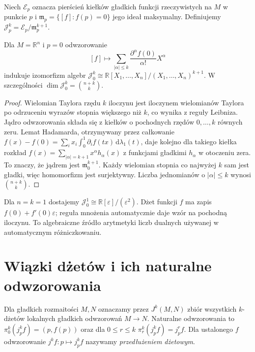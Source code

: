 \begin{definicja}
\label{def:dzety-algebra}
Niech $\mathcal E_p$ oznacza pierścień kiełków gładkich
funkcji rzeczywistych na $M$ w punkcie $p$ i
$\mathfrak m_p=\{[f]:f(p)=0\}$ jego ideał maksymalny.
Definiujemy $\mathcal J_p^k=\mathcal E_p/\mathfrak m_p^{k+1}$.
\end{definicja}

\begin{twierdzenie}
\label{thm:dzety-algebra}
Dla $M=\mathbb R^n$ i $p=0$ odwzorowanie
\[
 [f]\longmapsto \sum_{|\alpha|\le k}
 \frac{\partial^\alpha f(0)}{\alpha!}X^\alpha
\]
indukuje izomorfizm algebr
$\mathcal J_0^k\cong\mathbb R[X_1,\ldots,X_n]/(X_1,\ldots,X_n)^{k+1}$.
W szczególności $\dim\mathcal J_0^k=\binom{n+k}{k}$.
\end{twierdzenie}
\begin{proof}
Wielomian Taylora rzędu $k$ iloczynu jest iloczynem
wielomianów Taylora po odrzuceniu wyrazów stopnia większego niż $k$,
co wynika z reguły Leibniza. Jądro odwzorowania składa się
z kiełków o pochodnych rzędów $0,\ldots,k$ równych zeru.
Lemat Hadamarda, otrzymywany przez całkowanie
$f(x)-f(0)=\sum_i x_i\int_0^1 \partial_i f(tx)\,\mathrm d\lambda_1(t)$,
daje kolejno dla takiego kiełka rozkład
$f(x)=\sum_{|\alpha|=k+1}x^\alpha h_\alpha(x)$
z funkcjami gładkimi $h_\alpha$ w otoczeniu zera.
To znaczy, że jądrem jest $\mathfrak m_0^{k+1}$.
Każdy wielomian stopnia co najwyżej $k$ sam jest gładki,
więc homomorfizm jest surjektywny. Liczba jednomianów
o $|\alpha|\le k$ wynosi $\binom{n+k}{k}$.
\end{proof}

\begin{przyklad}
\label{ex:dzety-dualne}
Dla $n=k=1$ dostajemy
$\mathcal J_0^1\cong\mathbb R[\varepsilon]/(\varepsilon^2)$.
Dżet funkcji $f$ ma zapis $f(0)+f'(0)\varepsilon$;
reguła mnożenia automatycznie daje wzór na pochodną iloczynu.
To algebraiczne źródło arytmetyki liczb dualnych używanej
w automatycznym różniczkowaniu.
\end{przyklad}

\section{Wiązki dżetów i ich naturalne odwzorowania}
\begin{definicja}
\label{def:dzety-bundle}
Dla gładkich rozmaitości $M,N$ oznaczamy przez $J^k(M,N)$
zbiór wszystkich $k$-dżetów lokalnych gładkich odwzorowań
$M\to N$. Naturalne odwzorowania to
$\pi_0^k(j_p^k f)=(p,f(p))$ oraz dla $0\le r\le k$
$\pi_r^k(j_p^k f)=j_p^r f$.
Dla ustalonego $f$ odwzorowanie $j^kf:p\mapsto j_p^kf$
nazywamy \emph{przedłużeniem dżetowym}.
\end{definicja}

